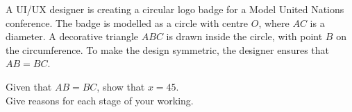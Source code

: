 \begin{question}
\noindent A UI/UX designer is creating a circular logo badge for a Model United Nations conference. The badge is modelled as a circle with centre $O$, where $AC$ is a diameter. A decorative triangle $ABC$ is drawn inside the circle, with point $B$ on the circumference. To make the design symmetric, the designer ensures that $AB = BC$.

\begin{center}
\end{center}

\noindent Given that $AB = BC$, show that $x = 45$.\\
Give reasons for each stage of your working.

\vspace{4cm}


\end{question}